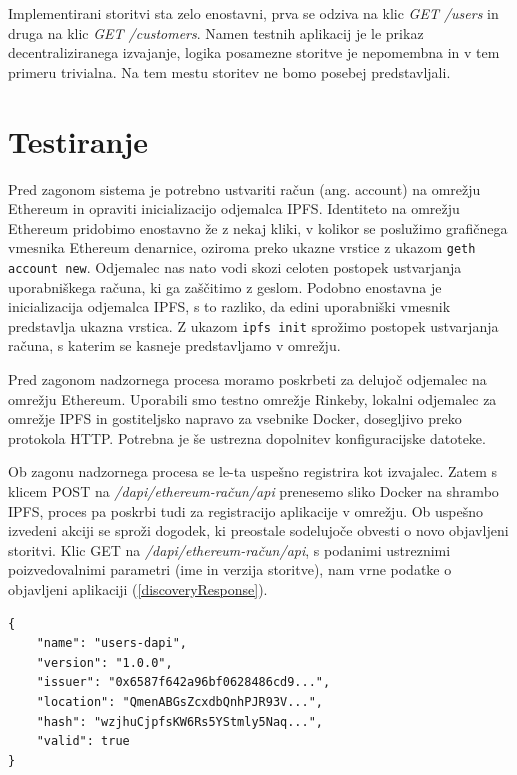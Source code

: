 \documentclass[a4paper, 12pt]{book}
\begin{document}
Implementirani storitvi sta zelo enostavni, prva se odziva na klic \textit{GET /users} in druga na klic \textit{GET /customers}.
Namen testnih aplikacij je le prikaz decentraliziranega izvajanje, logika posamezne storitve je nepomembna in v tem primeru trivialna.
Na tem mestu storitev ne bomo posebej predstavljali.

\section{Testiranje}
Pred zagonom sistema je potrebno ustvariti račun (ang. account) na omrežju Ethereum in opraviti inicializacijo odjemalca IPFS.
Identiteto na omrežju Ethereum pridobimo enostavno že z nekaj kliki, v kolikor se poslužimo grafičnega vmesnika Ethereum denarnice, oziroma preko ukazne vrstice z ukazom \texttt{geth account new}.
Odjemalec nas nato vodi skozi celoten postopek ustvarjanja uporabniškega računa, ki ga zaščitimo z geslom.
Podobno enostavna je inicializacija odjemalca IPFS, s to razliko, da edini uporabniški vmesnik predstavlja ukazna vrstica.
Z ukazom \texttt{ipfs init} sprožimo postopek ustvarjanja računa, s katerim se kasneje predstavljamo v omrežju.

Pred zagonom nadzornega procesa moramo poskrbeti za delujoč odjemalec na omrežju Ethereum. Uporabili smo testno omrežje Rinkeby, lokalni odjemalec za omrežje IPFS in gostiteljsko napravo za vsebnike Docker, dosegljivo preko protokola HTTP.
Potrebna je še ustrezna dopolnitev konfiguracijske datoteke.

Ob zagonu nadzornega procesa se le-ta uspešno registrira kot izvajalec.
Zatem s klicem POST na \textit{/dapi/{ethereum-račun}/api} prenesemo sliko Docker na shrambo IPFS, proces pa poskrbi tudi za registracijo aplikacije v omrežju.
Ob uspešno izvedeni akciji se sproži dogodek, ki preostale sodelujoče obvesti o novo objavljeni storitvi.
Klic GET na \textit{/dapi/{ethereum-račun}/api}, s podanimi ustreznimi poizvedovalnimi parametri (ime in verzija storitve), nam vrne podatke o objavljeni aplikaciji (\ref{discoveryResponse}).

\begin{lstlisting}[caption={Odziv storitve ob uspešno odkriti registrirani aplikaciji},captionpos=b,label={discoveryResponse}]
{
	"name": "users-dapi",
	"version": "1.0.0",
	"issuer": "0x6587f642a96bf0628486cd9...",
	"location": "QmenABGsZcxdbQnhPJR93V...",
	"hash": "wzjhuCjpfsKW6Rs5YStmly5Naq...",
	"valid": true
}	
\end{lstlisting}
\end{document}
